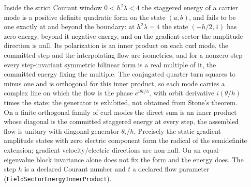 \documentclass[11pt]{article}
\begin{document}
Inside the strict Courant window \(0 < h^2\lambda < 4\) the staggered energy
of a carrier mode is a positive definite quadratic form on the state
\((a, b)\), and fails to be one exactly at and beyond the boundary: at
\(h^2\lambda = 4\) the state \((-h/2, 1)\) has zero energy, beyond it negative
energy, and on the gradient sector the amplitude direction is null. Its
polarization is an inner product on each curl mode, the committed step and
the interpolating flow are isometries, and for a nonzero step every
step-invariant symmetric bilinear form is a real multiple of it, the
committed energy fixing the multiple. The conjugated quarter turn squares to
minus one and is orthogonal for this inner product, so each mode carries a
complex line on which the flow is the phase \(e^{i\theta t/h}\), with orbit
derivative \(i(\theta/h)\) times the state; the generator is exhibited, not
obtained from Stone's theorem. On a finite orthogonal family of curl modes
the direct sum is an inner product whose diagonal is the committed staggered
energy at every step, the assembled flow is unitary with diagonal generator
\(\theta_i/h\). Precisely the static gradient-amplitude states with zero
electric component form the radical of the semidefinite extension; gradient
velocity/electric directions are non-null. On an
equal-eigenvalue block invariance alone does not fix the form and the energy
does. The step \(h\) is a declared Courant number and \(t\) a declared flow
parameter (\texttt{FieldSectorEnergyInnerProduct}).
\end{document}
